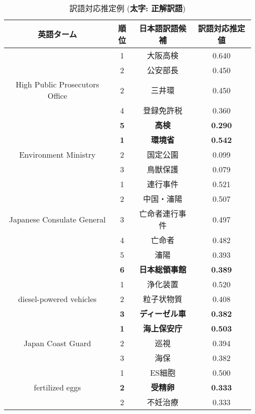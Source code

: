 \begin{table}

\begin{center}

 \caption{訳語対応推定例 ({\bf 太字: 正解訳語})}
 \label{tab:est}
\hspace*{.001cm}
{
  \begin{tabular}{|c||c|c|c|}
   \hline
   英語ターム & 順位  & 日本語訳語候補 & 訳語対応推定値 \\ \hline\hline
& 1 & 大阪高検 &       0.640 \\ \cline{2-4}
& 2 & 公安部長 &      0.450  \\ \cline{2-4}
  High Public Prosecutors Office 
& 2 & 三井環   &       0.450 \\ \cline{2-4}
& 4 & 登録免許税 &      0.360 \\ \cline{2-4}
& {\bf 5} & {\bf 高検} & {\bf 0.290} \\ \hline\hline
& {\bf 1} & {\bf 環境省} &   {\bf 0.542} \\ \cline{2-4}
  Environment Ministry 
& 2 & 国定公園 &  0.099 \\ \cline{2-4}
& 3 & 鳥獣保護 &  0.079 \\ \hline\hline
& 1 & 連行事件   &   0.521 \\ \cline{2-4}
& 2 & 中国・瀋陽 &       0.507 \\ \cline{2-4}
  Japanese Consulate General 
& 3 & 亡命者連行事件 &       0.497 \\ \cline{2-4}
& 4 & 亡命者 &   0.482 \\ \cline{2-4}
& 5 & 瀋陽 &     0.393 \\ \cline{2-4}
& {\bf 6} & {\bf 日本総領事館} &   {\bf 0.389} \\ \hline\hline
& 1 & 浄化装置 & 0.520 \\ \cline{2-4}
  diesel-powered vehicles 
& 2 & 粒子状物質 &  0.408 \\ \cline{2-4}
& {\bf 3} & {\bf ディーゼル車} &  {\bf 0.382} \\ \hline\hline
& {\bf 1} & {\bf 海上保安庁} & {\bf 0.503} \\ \cline{2-4}
  Japan Coast Guard 
& 2 & 巡視 & 0.394 \\ \cline{2-4}
& 3 & 海保 & 0.382 \\ \hline\hline
& 1 & ES細胞 &  0.500 \\ \cline{2-4}
  fertilized eggs 
& {\bf 2} & {\bf 受精卵} &  {\bf 0.333} \\ \cline{2-4}
& 2 & 不妊治療 & 0.333 \\ \hline\hline

\end{tabular}}
\end{center}
\end{table}
